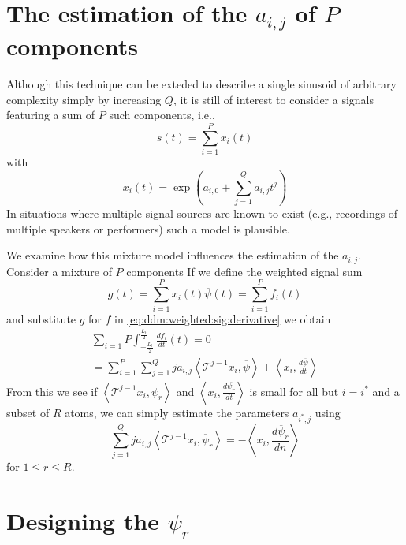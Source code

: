 \documentclass[twoside,a4paper]{article}
\begin{document}
\section{The estimation of the $a_{i,j}$ of $P$ components}

Although this technique can be exteded to describe a single
sinusoid of arbitrary complexity simply by increasing $Q$, it is still of
interest to consider a signals featuring a sum of $P$ such components, i.e.,
%
\[
    s(t) = \sum_{i=1}^{P} x_{i}(t)
\]
%
with
%
\[
    x_{i}(t) = \exp(a_{i,0} + \sum_{j=1}^{Q} a_{i,j} t^j)
\]
%
In situations where multiple signal sources are known to exist (e.g., recordings
of multiple speakers or performers) such a model is plausible.

We examine how this mixture model influences the estimation of the $a_{i,j}$.
Consider a mixture of $P$ components
If we define the weighted signal sum
%
\[
    g(t) = \sum_{i=1}^{P} x_{i}(t) \overline{\psi}(t) = \sum_{i=1}^{P} f_{i}(t)
\]
%
and substitute $g$ for $f$ in \ref{eq:ddm:weighted:sig:derivative} we obtain
%
\begin{multline}
    \sum_{i=1}{P} \int_{-\frac{L_{t}}{2}}^{\frac{L_{t}}{2}} \frac{df_{i}}{dt}(t) =
    0
    \\ = 
    \sum_{i=1}^{P}
    \sum_{j=1}^{Q} j a_{i,j} 
    \left\langle \mathcal{T}^{j-1} x_i , \overline{\psi} \right\rangle
     + \left\langle x_i, \frac{d\overline{\psi}}{dt} \right\rangle
\end{multline}
%
From this we see if $\left\langle \mathcal{T}^{j-1} x_i , \overline{\psi}_{r}
\right\rangle$ and $\left\langle x_i, \frac{d\overline{\psi_{r}}}{dt} \right\rangle$
is small for all but $i = i^{\ast}$ and a subset of $R$ atoms, we
can simply estimate the parameters $a_{i^{\ast},j}$ using
\[
    \sum_{j=1}^{Q} j a_{i,j} 
    \left\langle \mathcal{T}^{j-1} x_i , \overline{\psi}_{r} \right\rangle
    = -\left\langle x_i, \frac{d\overline{\psi}_{r}}{dn} \right\rangle
\]
for $1 \leq r \leq R$.

\section{Designing the $\psi_{r}$}
\end{document}
